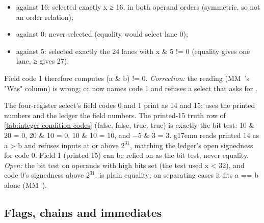 \begin{itemize}
\item against 16: selected exactly x ≥ 16, in both operand orders (symmetric, so not an order relation);
\item against 0: never selected (equality would select lane 0);
\item against 5: selected exactly the 24 lanes with x \& 5 != 0 (equality gives one lane, ≥ gives 27).
\end{itemize}

Field code 1 therefore computes (a \& b) != 0. \emph{Correction:} the  reading (MM~'s "Was" column) is wrong; cc now names
code 1  and refuses a select that asks for .

The four-register select's field codes 0 and 1 print as 14 and 15;  uses
the printed numbers and the ledger the field numbers. The printed-15 truth row of \cref{tab:integer-condition-codes} (false, false, true,
true) is exactly the bit test: 10 \& 20 = 0, 20 \& 10 = 0, 10 \& 10 = 10, and −5 \& 3 = 3. g17emu reads printed 14 as a > b
and refuses inputs at or above $2^{31}$, matching the ledger's open signedness for code 0. Field 1 (printed 15) can be
relied on as the bit test, never equality. \emph{Open:} the bit test on operands with high bits set (the
test used x < 32), and code 0's signedness above $2^{31}$.  is plain
equality; on separating cases it fits a == b alone (MM~).

\subsection*{Flags, chains and immediates}\label{sub:flags-chains-immediates}


